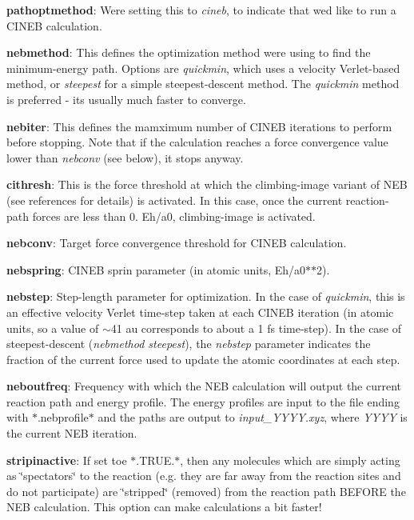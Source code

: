 \begin{DoxyItemize}
\item {\bfseries pathoptmethod}\+: We\textquotesingle{}re setting this to {\itshape cineb}, to indicate that we\textquotesingle{}d like to run a C\+I\+N\+EB calculation.
\item {\bfseries nebmethod}\+: This defines the optimization method we\textquotesingle{}re using to find the minimum-\/energy path. Options are {\itshape quickmin}, which uses a velocity Verlet-\/based method, or {\itshape steepest} for a simple steepest-\/descent method. The {\itshape quickmin} method is preferred -\/ it\textquotesingle{}s usually much faster to converge.
\item {\bfseries nebiter}\+: This defines the mamximum number of C\+I\+N\+EB iterations to perform before stopping. Note that if the calculation reaches a force convergence value lower than {\itshape nebconv} (see below), it stops anyway.
\item {\bfseries cithresh}\+: This is the force threshold at which the climbing-\/image variant of N\+EB (see references for details) is activated. In this case, once the current reaction-\/path forces are less than 0. Eh/a0, climbing-\/image is activated.
\item {\bfseries nebconv}\+: Target force convergence threshold for C\+I\+N\+EB calculation.
\item {\bfseries nebspring}\+: C\+I\+N\+EB sprin parameter (in atomic units, Eh/a0$\ast$$\ast$2).
\item {\bfseries nebstep}\+: Step-\/length parameter for optimization. In the case of {\itshape quickmin}, this is an effective velocity Verlet time-\/step taken at each C\+I\+N\+EB iteration (in atomic units, so a value of $\sim$41 au corresponds to about a 1 fs time-\/step). In the case of steepest-\/descent ({\itshape nebmethod steepest}), the {\itshape nebstep} parameter indicates the fraction of the current force used to update the atomic coordinates at each step.
\item {\bfseries neboutfreq}\+: Frequency with which the N\+EB calculation will output the current reaction path and energy profile. The energy profiles are input to the file ending with $\ast$.nebprofile$\ast$ and the paths are output to {\itshape input\+\_\+\+Y\+Y\+Y\+Y.\+xyz}, where {\itshape Y\+Y\+YY} is the current N\+EB iteration.
\item {\bfseries stripinactive}\+: If set toe $\ast$.T\+R\+UE.$\ast$, then any molecules which are simply acting as \char`\"{}spectators\char`\"{} to the reaction (e.\+g. they are far away from the reaction sites and do not participate) are \char`\"{}stripped\char`\"{} (removed) from the reaction path B\+E\+F\+O\+RE the N\+EB calculation. This option can make calculations a bit faster!
$$
\end{DoxyItemize}
